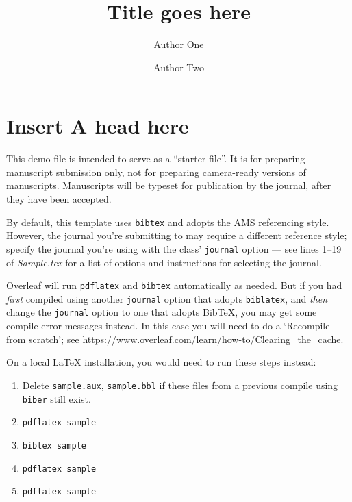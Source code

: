 \documentclass[journal=eds]{CAM-MODERN}%
\theoremstyle{definition}
\numberwithin{equation}{section}
\begin{document}
\begin{Frontmatter}

\title[Short Title]{Title goes here}

\author[1]{Author One}
\author[2]{Author Two}

\address[1]{Department, University, Country}
\address[2]{Department, University, Country}




\end{Frontmatter}

\clearpage
\linenumbers

\section{Insert A head here}
This demo file is intended to serve as a ``starter file''. It is for preparing manuscript submission only, not for preparing camera-ready versions of manuscripts. Manuscripts will be typeset for publication by the journal, after they have been accepted.

By default, this template uses \texttt{bibtex} and adopts the AMS referencing style. However, the journal you’re submitting to may require a different reference style; specify the journal you're using with the class' \texttt{journal} option --- see lines 1--19 of \emph{Sample.tex} for a list of options and instructions for selecting the journal. 

Overleaf will run \texttt{pdflatex} and \texttt{bibtex} automatically as needed. But if you had \emph{first} compiled using another \texttt{journal} option that adopts \texttt{biblatex}, and \emph{then} change the \texttt{journal} option to one that adopts Bib\TeX{}, you may get some compile error messages instead. In this case you will need to do a `Recompile from scratch'; see \url{https://www.overleaf.com/learn/how-to/Clearing_the_cache}.

On a local \LaTeX{} installation, you would need to run these steps instead:
\begin{enumerate}
    \item Delete \texttt{sample.aux}, \texttt{sample.bbl} if these files from a previous compile using \texttt{biber} still exist.
    \item \verb|pdflatex sample|
    \item \verb|bibtex sample|
    \item \verb|pdflatex sample|
    \item \verb|pdflatex sample|
\end{enumerate}
\end{document}
